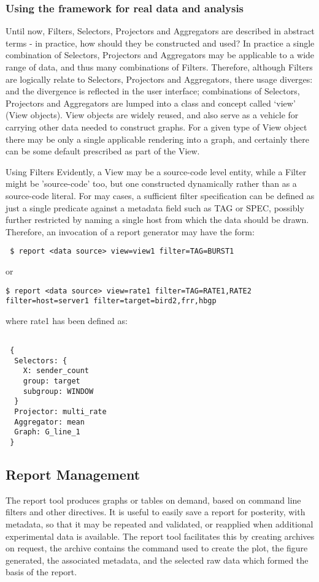 \subsubsection{ Using the framework for real data and analysis}
 Until now, Filters, Selectors, Projectors and Aggregators are described in abstract terms - in practice, how should they be constructed and used?
 In practice a single combination of Selectors, Projectors and Aggregators may be applicable to a wide range of data, and thus many combinations of Filters.  Therefore, although Filters are logically relate to Selectors, Projectors and Aggregators, there usage diverges: and the divergence is reflected in the user interface; combinations of Selectors, Projectors and Aggregators are lumped into a class and concept called `view' (View objects).  View objects are widely reused, and also serve as a vehicle for carrying other data needed to construct graphs.  For a given type of View object there may be only a single applicable rendering into a graph, and certainly there can be some default prescribed as part of the View.

 Using Filters
 Evidently, a View may be a source-code level entity, while a Filter might be 'source-code' too, but one constructed dynamically rather than as a source-code literal.  For may cases, a sufficient filter specification can be defined as just a single predicate against a metadata field such as TAG or SPEC, possibly further restricted by naming a single host from which the data should be drawn.  Therefore, an invocation of a report generator may have the form:

\verb| $ report <data source> view=view1 filter=TAG=BURST1|

 or 
 
\begin{lstlisting}
$ report <data source> view=rate1 filter=TAG=RATE1,RATE2 filter=host=server1 filter=target=bird2,frr,hbgp
\end{lstlisting}
 where rate1 has been defined as:
\begin{lstlisting}

 {
  Selectors: {
    X: sender_count
    group: target
    subgroup: WINDOW
  }
  Projector: multi_rate
  Aggregator: mean
  Graph: G_line_1
 }
\end{lstlisting}

\subsection{ Report Management}
 The report tool produces graphs or tables on demand, based on command line filters and other directives.
 It is useful to easily save a report for posterity, with metadata, so that it may be repeated and validated, or reapplied when additional experimental data is available.
 The report tool facilitates this by creating archives on request, the archive contains the command used to create the plot, the figure generated, the associated metadata, and the selected raw data which formed the basis of the report.

